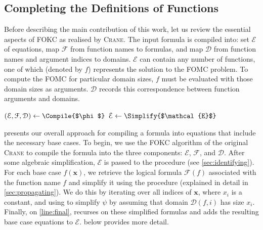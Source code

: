 \documentclass[a4paper,UKenglish,cleveref, autoref, thm-restate]{lipics-v2021}
\begin{document}

\subsection{Completing the Definitions of Functions}\label{sec:completing}

Before describing the main contribution of this work, let us review the
essential aspects of FOKC as realised by \textsc{Crane}. The input formula is
compiled into: set $\mathcal{E}$ of equations, map $\mathcal{F}$ from function
names to formulas, and map $\mathcal{D}$ from function names and argument
indices to domains. $\mathcal{E}$ can contain any number of functions, one of
which (denoted by $f$) represents the solution to the FOMC problem. To compute
the FOMC for particular domain sizes, $f$ must be evaluated with those domain
sizes as arguments. $\mathcal{D}$ records this correspondence between function
arguments and domains.

\begin{algorithm}[t]
  \caption{\protect\CompileWithBaseCases{$\phi$}}\label{alg:compilewithbasecases}
  $(\mathcal{E}, \mathcal{F}, \mathcal{D}) \gets \Compile{$\phi$}$\;
  $\mathcal{E} \gets \Simplify{$\mathcal{E}$}$\;\label{line:second}
\end{algorithm}

 presents our overall approach for compiling a
formula into equations that include the necessary base cases. To begin, we use
the FOKC algorithm of the original \textsc{Crane} to compile the formula into
the three components: $\mathcal{E}$, $\mathcal{F}$, and $\mathcal{D}$. After
some algebraic simplification, $\mathcal{E}$ is passed to the \FindBaseCases
procedure (see \cref{sec:identifying}). For each base case $f(\mathbf{x})$, we
retrieve the logical formula $\mathcal{F}(f)$ associated with the function name
$f$ and simplify it using the \Propagate procedure (explained in detail in
\cref{sec:propagating}). We do this by iterating over all indices of
$\mathbf{x}$, where $x_{i}$ is a constant, and using \Propagate to simplify
$\psi$ by assuming that domain $\mathcal{D}(f, i)$ has size $x_{i}$. Finally, on
\autoref{line:final}, \CompileWithBaseCases recurses on these simplified
formulas and adds the resulting base case equations to $\mathcal{E}$.
 below provides more detail.
\end{document}
